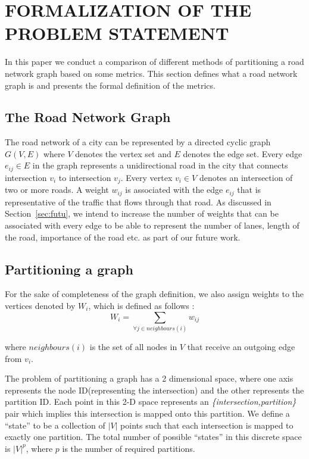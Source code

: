 \section{FORMALIZATION OF THE PROBLEM STATEMENT}
\label{sec:form}

In this paper we conduct a comparison of different methods of partitioning a road network graph based on some metrics. This section defines what a road network graph is and presents the formal definition of the metrics.

\subsection{The Road Network Graph}
\label{sec:form-road-netw-grap}
The road network of a city can be represented by a directed cyclic graph~\cite{holden1995mathematical} $G(V, E)$ where $V$ denotes the vertex set and $E$ denotes the edge set. Every edge $e_{ij} \in E$ in the graph represents a unidirectional road in the city that connects intersection $v_i$ to intersection $v_j$. Every vertex $v_i \in V$ denotes an intersection of two or more roads. A weight $w_{ij}$ is associated with the edge $e_{ij}$ that is representative of the traffic that flows through that road. As discussed in Section~\ref{sec:futu}, we intend to increase the number of weights that can be associated with every edge to be able to represent the number of lanes, length of the road, importance of the road etc. as part of our future work.

\subsection{Partitioning a graph}
\label{sec:form-part}
For the sake of completeness of the graph definition, we also assign weights to the vertices denoted by $W_i$, which is defined as follows :
\begin{equation}
\label{eq:vertex-weight}
W_i = \sum\limits_{\forall j \in neighbours(i)} w_{ij}
\end{equation}

\noindent where $neighbours(i)$ is the set of all nodes in $V$ that receive an outgoing edge from $v_i$. 

The problem of partitioning a graph has a 2 dimensional space, where one axis represents the node ID(representing the intersection) and the other represents the partition ID. Each point in this 2-D space represents an \textit{\{intersection,partition\}} pair which implies this intersection is mapped onto this partition. We define a ``state'' to be a collection of $|V|$ points such that each intersection is mapped to exactly one partition. The total number of possible ``states'' in this discrete space is $|V|^{p}$, where $p$ is the number of required partitions.


